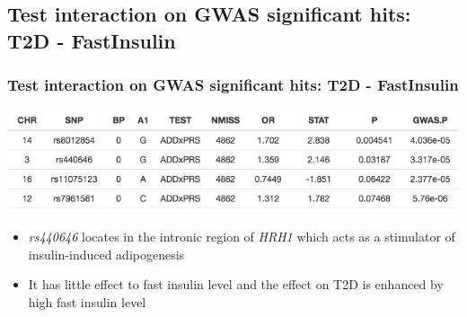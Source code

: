 \documentclass{beamer}
\begin{document}
  \subsection{Test interaction on GWAS significant hits: T2D - FastInsulin}
  \begin{frame}
  \frametitle{Test interaction on GWAS significant hits: T2D - FastInsulin}
    \centering
    \includegraphics[width=.8\linewidth]{insulin}
    \label{fig:insulin}
    \begin{itemize}
      \item \textit{rs440646} locates in the intronic region of \textit{HRH1} which acts as a stimulator of insulin-induced adipogenesis
      \item It has little effect to fast insulin level and the effect on T2D is enhanced by high fast insulin level
    \end{itemize}
  \end{frame}
\end{document}
